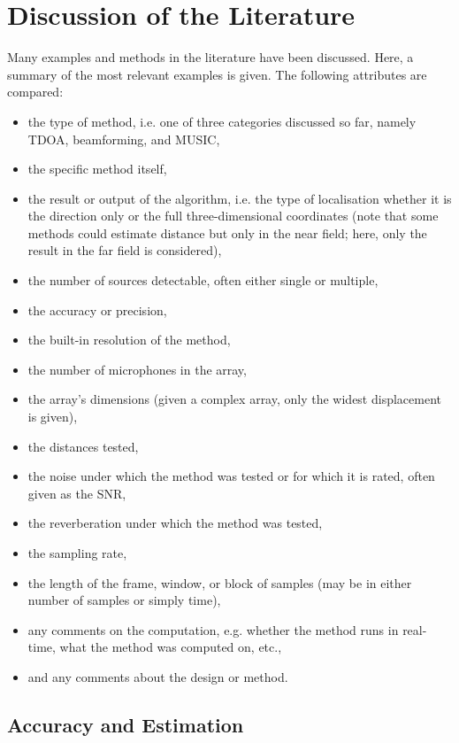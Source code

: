 \documentclass[notitlepage]{report}
\begin{document}
\section{Discussion of the Literature}

Many examples and methods in the literature have been discussed. Here, a summary of the most relevant examples is given. The following attributes are compared:
\begin{itemize}
	\item the type of method, i.e. one of three categories discussed so far, namely TDOA, beamforming, and MUSIC,
	\item the specific method itself,
	\item the result or output of the algorithm, i.e. the type of localisation whether it is the direction only or the full three-dimensional coordinates (note that some methods could estimate distance but only in the near field; here, only the result in the far field is considered),
	\item the number of sources detectable, often either single or multiple,
	\item the accuracy or precision,
	\item the built-in resolution of the method,
	\item the number of microphones in the array,
	\item the array's dimensions (given a complex array, only the widest displacement is given),
	\item the distances tested,
	\item the noise under which the method was tested or for which it is rated, often given as the SNR,
	\item the reverberation under which the method was tested,
	\item the sampling rate,
	\item the length of the frame, window, or block of samples (may be in either number of samples or simply time),
	\item any comments on the computation, e.g. whether the method runs in real-time, what the method was computed on, etc.,
	\item and any comments about the design or method.
\end{itemize}

\subsection{Accuracy and Estimation}
\end{document}
